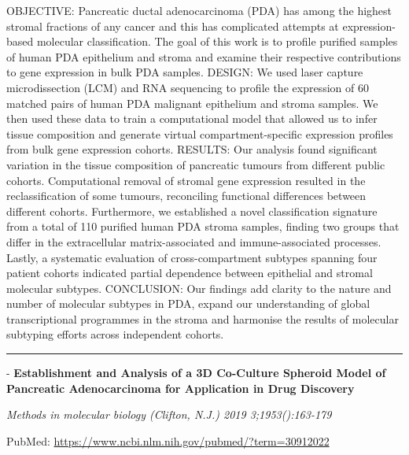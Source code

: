 \documentclass[]{article}
\begin{document}
OBJECTIVE: Pancreatic ductal adenocarcinoma (PDA) has among the highest
stromal fractions of any cancer and this has complicated attempts at
expression-based molecular classification. The goal of this work is to
profile purified samples of human PDA epithelium and stroma and examine
their respective contributions to gene expression in bulk PDA samples.
DESIGN: We used laser capture microdissection (LCM) and RNA sequencing
to profile the expression of 60 matched pairs of human PDA malignant
epithelium and stroma samples. We then used these data to train a
computational model that allowed us to infer tissue composition and
generate virtual compartment-specific expression profiles from bulk gene
expression cohorts. RESULTS: Our analysis found significant variation in
the tissue composition of pancreatic tumours from different public
cohorts. Computational removal of stromal gene expression resulted in
the reclassification of some tumours, reconciling functional differences
between different cohorts. Furthermore, we established a novel
classification signature from a total of 110 purified human PDA stroma
samples, finding two groups that differ in the extracellular
matrix-associated and immune-associated processes. Lastly, a systematic
evaluation of cross-compartment subtypes spanning four patient cohorts
indicated partial dependence between epithelial and stromal molecular
subtypes. CONCLUSION: Our findings add clarity to the nature and number
of molecular subtypes in PDA, expand our understanding of global
transcriptional programmes in the stroma and harmonise the results of
molecular subtyping efforts across independent cohorts.

{}

{}

\begin{center}\rule{0.5\linewidth}{\linethickness}\end{center}

 - \textbf{Establishment and Analysis of a 3D Co-Culture Spheroid Model
of Pancreatic Adenocarcinoma for Application in Drug Discovery}

\emph{Methods in molecular biology (Clifton, N.J.) 2019
3;1953():163-179}

PubMed: \url{https://www.ncbi.nlm.nih.gov/pubmed/?term=30912022}
\end{document}

